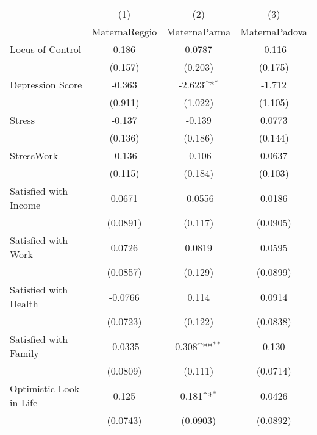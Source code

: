 {
\def\sym#1{\ifmmode^{#1}\else\(^{#1}\)\fi}
\begin{tabular}{l*{3}{c}}
\hline\hline
            &\multicolumn{1}{c}{(1)}&\multicolumn{1}{c}{(2)}&\multicolumn{1}{c}{(3)}\\
            &\multicolumn{1}{c}{MaternaReggio}&\multicolumn{1}{c}{MaternaParma}&\multicolumn{1}{c}{MaternaPadova}\\
\hline
Locus of Control&       0.186         &      0.0787         &      -0.116         \\
            &     (0.157)         &     (0.203)         &     (0.175)         \\
[1em]
Depression Score&      -0.363         &      -2.623\sym{*}  &      -1.712         \\
            &     (0.911)         &     (1.022)         &     (1.105)         \\
[1em]
Stress      &      -0.137         &      -0.139         &      0.0773         \\
            &     (0.136)         &     (0.186)         &     (0.144)         \\
[1em]
StressWork  &      -0.136         &      -0.106         &      0.0637         \\
            &     (0.115)         &     (0.184)         &     (0.103)         \\
[1em]
Satisfied with Income&      0.0671         &     -0.0556         &      0.0186         \\
            &    (0.0891)         &     (0.117)         &    (0.0905)         \\
[1em]
Satisfied with Work&      0.0726         &      0.0819         &      0.0595         \\
            &    (0.0857)         &     (0.129)         &    (0.0899)         \\
[1em]
Satisfied with Health&     -0.0766         &       0.114         &      0.0914         \\
            &    (0.0723)         &     (0.122)         &    (0.0838)         \\
[1em]
Satisfied with Family&     -0.0335         &       0.308\sym{**} &       0.130         \\
            &    (0.0809)         &     (0.111)         &    (0.0714)         \\
[1em]
Optimistic Look in Life&       0.125         &       0.181\sym{*}  &      0.0426         \\
            &    (0.0743)         &    (0.0903)         &    (0.0892)         \\

\end{tabular}}
